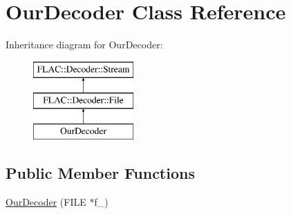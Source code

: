 \hypertarget{class_our_decoder}{}\section{Our\+Decoder Class Reference}
\label{class_our_decoder}
Inheritance diagram for Our\+Decoder\+:\begin{figure}[H]
\begin{center}
\leavevmode
\includegraphics[height=3.000000cm]{class_our_decoder}
\end{center}
\end{figure}
\subsection*{Public Member Functions}
\begin{DoxyCompactItemize}
\item 
\hyperlink{class_our_decoder_a511d0a64ab40974d9b402e650e68f149}{Our\+Decoder} (F\+I\+LE $\ast$f\+\_\+)
\end{DoxyCompactItemize}
